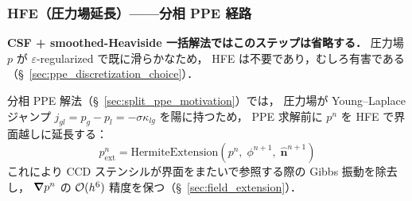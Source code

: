\subsubsection{HFE（圧力場延長）——分相 PPE 経路}
\label{app:hfe_predictor}

\noindent\textbf{CSF + smoothed-Heaviside 一括解法ではこのステップは省略する．}
圧力場 $p$ が $\varepsilon$-regularized で既に滑らかなため，
HFE は不要であり，むしろ有害である（§~\ref{sec:ppe_discretization_choice}）．

分相 PPE 解法（§~\ref{sec:split_ppe_motivation}）では，
圧力場が Young--Laplace ジャンプ $j_{gl}=p_g-p_l=-\sigma\kappa_{lg}$ を陽に持つため，
PPE 求解前に $p^n$ を HFE で界面越しに延長する：
\[
  p^n_{\mathrm{ext}} = \text{HermiteExtension}(p^n,\; \phi^{n+1},\; \hat{\bm{n}}^{n+1})
\]
これにより CCD ステンシルが界面をまたいで参照する際の Gibbs 振動を除去し，
$\bm{\nabla} p^n$ の $\mathcal{O}(h^6)$ 精度を保つ（§~\ref{sec:field_extension}）．
